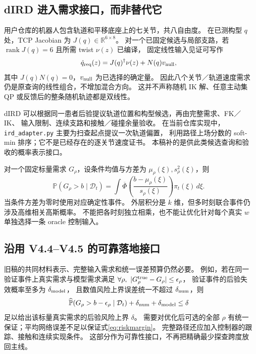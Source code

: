 \documentclass[11pt,a4paper]{article}
\numberwithin{equation}{section}
\theoremstyle{definition}
\newcommand{\R}{\mathbb R}
\newcommand{\Prob}{\mathbb P}
\newcommand{\D}{\mathcal D}
\DeclareMathOperator{\rank}{rank}
\begin{document}
\subsection{dIRD 进入需求接口，而非替代它}
用户仓库的机器人包含轨道和平移底座上的七关节，共八自由度。
在已测构型 \(q\) 处，TCP Jacobian 为 \(J(q)\in\R^{6\times8}\)。
对一个已固定候选与局部支路，若 \(\rank J(q)=6\) 且所需 twist \(\nu(z)\) 已编译，
固定线性输入见证可写作
\begin{equation}
 \dot q_{\rm req}(z)=J(q)^\dagger\nu(z)+N(q)v_{\rm null},
 \label{eq:robotquery}
\end{equation}
其中 \(J(q)N(q)=0\)，\(v_{\rm null}\) 为已选择的确定量。
因此八个关节／轨道速度需求仍是原查询的线性组合，不增加混合方向。
这并不声称随机 IK 解、任意主动集 QP 或反馈后的整条随机轨迹都是双线性。

dIRD 可以根据同一患者后验提议轨道位置和构型候选，再由完整需求、FK／IK、
输入限制、连续支路和接触／碰撞余量验收。
在当前仓库实现中，\texttt{ird\_adapter.py} 主要为扫查起点提议一次轨道偏置，
利用路径上场分数的 soft-min 排序；它不是已经存在的逐关节速度证书。
本稿补的是供此类候选查询和验收的概率表示接口。

对一个固定标量需求 \(G_\rho\)，设条件均值与方差为 \(\mu_\rho(\xi),s_\rho^2(\xi)\)，则
\begin{equation}
 \Prob(G_\rho>b\mid\D_t)=
 \int\overline\Phi\!\left(\frac{b-\mu_\rho(\xi)}{s_\rho(\xi)}\right)
 \pi_t(\xi)\,d\xi .
 \label{eq:tail}
\end{equation}
当条件方差为零时使用对应确定性事件。
外层积分是 \(k\) 维，但多时刻联合事件仍涉及高维相关高斯概率。
不能把各时刻独立相乘，也不能让优化针对每个真实 \(w\) 单独选择一条 oracle 控制输入。

\subsection{沿用 V4.4--V4.5 的可靠落地接口}
旧稿的共同材料表示、完整输入需求和统一误差预算仍然必要。
例如，若在同一验证事件上真实需求与模型需求满足
\(\forall\rho,\ |G_\rho^{\rm true}-G_\rho|\le\epsilon_\rho\)，
验证事件的后验失效概率至多为 \(\delta_{\rm model}\)，
且数值风险上界误差统一不超过 \(\delta_{\rm num}\)，则
\begin{equation}
 \widehat{\Prob}(G_\rho>b-\epsilon_\rho\mid\D_t)
 +\delta_{\rm num}+\delta_{\rm model}\le\delta
 \label{eq:riskmargin}
\end{equation}
足以给出该标量真实需求的后验风险上界 \(\delta\)。
需要对优化后可选的全部 \(\rho\) 有统一保证；平均网络误差不足以保证式\eqref{eq:riskmargin}。
完整路径还应加入控制器的跟踪、接触和连续实现条件。
这部分作为可靠性接口，不再把精确最少探查跨度放回主线。
\end{document}
